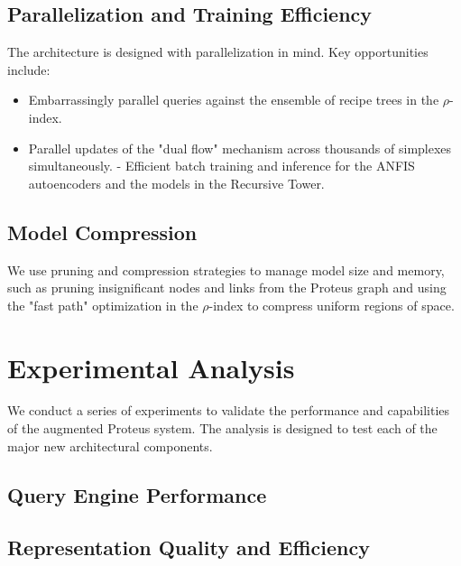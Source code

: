 \documentclass{article}
\begin{document}
\subsection{Parallelization and Training Efficiency}
The architecture is designed with parallelization in mind. Key opportunities include:
\begin{itemize}
    \item Embarrassingly parallel queries against the ensemble of recipe trees in the $\rho$-index.
    \item Parallel updates of the "dual flow" mechanism across thousands of simplexes simultaneously.
    - Efficient batch training and inference for the ANFIS autoencoders and the models in the Recursive Tower.
\end{itemize}

\subsection{Model Compression}
We use pruning and compression strategies to manage model size and memory, such as pruning insignificant nodes and links from the Proteus graph and using the "fast path" optimization in the $\rho$-index to compress uniform regions of space.

\section{Experimental Analysis}

We conduct a series of experiments to validate the performance and capabilities of the augmented Proteus system. The analysis is designed to test each of the major new architectural components.

\subsection{Query Engine Performance}

\subsection{Representation Quality and Efficiency}
\end{document}
